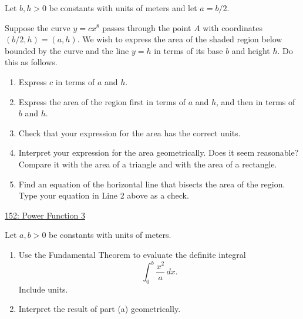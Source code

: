 \documentclass{ximera}
\begin{document}
\begin{question} \label{QOLDefeefKRerbttp}
Let $b,h>0$ be constants with units of meters and let $a=b/2$.

Suppose the curve $y=cx^8$ passes through the point $A$ with coordinates $(b/2,h) = (a,h)$. We wish to express the area of the shaded region below bounded by the curve and the line $y=h$ in terms of its base $b$ and height $h$. Do this as follows.

\begin{enumerate}

\item Express $c$ in terms of $a$ and $h$.

\item Express the area of the region first in terms of $a$ and $h$, and then in terms of $b$ and $h$.

\item Check that your expression for the area has the correct units. 

\item Interpret  your expression for the area geometrically. Does it seem reasonable? Compare it with the area of a triangle and with the area of a rectangle. 

\item Find an equation of the horizontal line that bisects the area of the region. Type your equation in Line 2 above as a check. 

\end{enumerate}

\begin{onlineOnly}
    \begin{center}
\end{center}
\end{onlineOnly}

\href{https://www.desmos.com/calculator/egdpe7cccl}{152: Power Function 3}

\end{question}




\begin{question} \label{QOidfsfer}
Let $a,b>0$ be constants with units of meters.
\begin{enumerate}
\item Use the Fundamental Theorem to evaluate the definite integral
\[
   \int_0^b \frac{x^2}{a}\, dx . 
\]
Include units.

\item Interpret the result of part (a) geometrically.
\end{enumerate}

\end{question}
\end{document}
